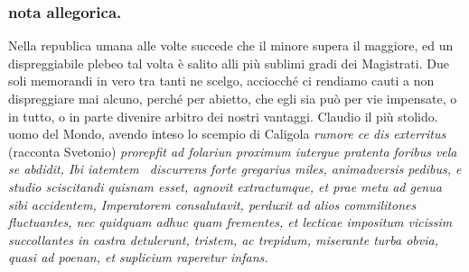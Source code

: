 \documentclass[11pt,a6paper]{article}
\begin{document}
\subsubsection{nota allegorica.}
{\footnotesize
Nella republica umana alle volte succede che
il minore supera il maggiore, ed un dispreggiabile
plebeo tal volta è salito alli più sublimi gradi dei
Magistrati. Due soli memorandi in vero tra tanti
ne scelgo, acciocché ci rendiamo cauti a non dispreggiare
mai alcuno, perché per abietto, che egli
sia può per vie impensate, o in tutto, o in parte
divenire arbitro dei nostri vantaggi. Claudio il più
stolido. uomo del Mondo, avendo inteso lo scempio
di Caligola \textit{rumore ce dis exterritus} (racconta
Svetonio) \textit{prorepfit ad folariun proximum iutergue
pratenta foribus vela se abdidit, Ibi iatemtem~
discurrens forte gregarius miles, animadversis pedibus,
e studio sciscitandi quisnam esset, agnovit
extractumque, et prae metu ad genua sibi
accidentem, Imperatorem consalutavit, perduxit ad
alios commilitones fluctuantes, nec quidquam adhuc
quam frementes, et lecticae impositum vicissim
succollantes in castra detulerunt, tristem, ac
trepidum, miserante turba obvia, quasi ad poenan, et
suplicium raperetur infans.}

}
\end{document}
